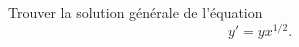 
\begin{exercice}\label{exoECdecembre2010-0003}

Trouver la solution générale de l'équation 
\begin{equation}
  y'=yx^{1/2}.
\end{equation}

\end{exercice}
